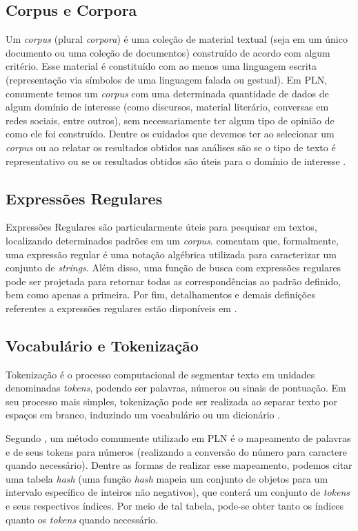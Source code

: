 \documentclass{automatextcc}
\begin{document}
\subsection{Corpus e Corpora}
Um \textit{corpus} (plural \textit{corpora}) é uma coleção de material textual (seja em um único documento ou uma coleção de documentos) construído de acordo com algum critério. Esse material é constituído com ao menos uma linguagem escrita (representação via símbolos de uma linguagem falada ou gestual). Em PLN, comumente temos um \textit{corpus} com uma determinada quantidade de dados de algum domínio de interesse (como discursos, material literário, conversas em redes sociais, entre outros), sem necessariamente ter algum tipo de opinião de como ele foi construído. Dentre os cuidados que devemos ter ao selecionar um \textit{corpus} ou ao relatar os resultados obtidos nas análises são se o tipo de texto é representativo ou se os resultados obtidos são úteis para o domínio de interesse \citep{manning1999, kamath2019}.



\subsection{Expressões Regulares}
Expressões Regulares são particularmente úteis para pesquisar em textos, localizando determinados padrões em um \textit{corpus}. \citet{jurafsky2021} comentam que, formalmente, uma expressão regular é uma notação algébrica utilizada para caracterizar um conjunto de \textit{strings}. Além disso, uma função de busca com expressões regulares pode ser projetada para retornar todas as correspondências ao padrão definido, bem como apenas a primeira. Por fim, detalhamentos e demais definições referentes a expressões regulares estão disponíveis em \citet{jurafsky2021}.



\subsection{Vocabulário e Tokenização}
Tokenização é o processo computacional de segmentar texto em unidades denominadas \textit{tokens}, podendo ser palavras, números ou sinais de pontuação. Em seu processo mais simples, tokenização pode ser realizada ao separar texto por espaços em branco, induzindo um vocabulário ou um dicionário \citep{kamath2019, jurafsky2021}.

Segundo \citet{manning1999}, um método comumente utilizado em PLN é o mapeamento de palavras e de seus tokens para números (realizando a conversão do número para caractere quando necessário). Dentre as formas de realizar esse mapeamento, podemos citar uma tabela \textit{hash} (uma função \textit{hash} mapeia um conjunto de objetos para um intervalo específico de inteiros não negativos), que conterá um conjunto de \textit{tokens} e seus respectivos índices. Por meio de tal tabela, pode-se obter tanto os índices quanto os \textit{tokens} quando necessário.
\end{document}
